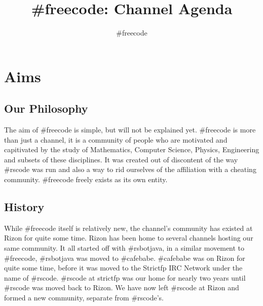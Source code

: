 \documentclass[11pt,a4paper,notitlepage]{article}
\title{\#freecode: Channel Agenda}
\author{\#freecode}
\begin{document}
\maketitle

\section{Aims}
\subsection{Our Philosophy}
The aim of \#freecode is simple, but will not be explained yet.
\#freecode is more than just a channel, it is a community of people who are motivated and capitivated by the study of Mathematics, Computer Science, Physics, Engineering and subsets of these disciplines. It was created out of  discontent of the way \#rscode was run and also a way to rid ourselves of the affiliation with a cheating community.
\#freecode freely exists as its own entity.

\subsection{History}
While \#freecode itself is relatively new, the channel's community has existed at Rizon for quite some time.
Rizon has been home to several channels hosting our same community.
It all started off with \#rsbotjava, in a similar movement to \#freecode, \#rsbotjava was moved to \#cafebabe.
\#cafebabe was on Rizon for quite some time, before it was moved to the Strictfp IRC Network under the name of \#rscode.
\#rscode at strictfp was our home for nearly two years until \#rscode was moved back to Rizon.
We have now left \#rscode at Rizon and formed a new community, separate from \#rscode's.
\end{document}

